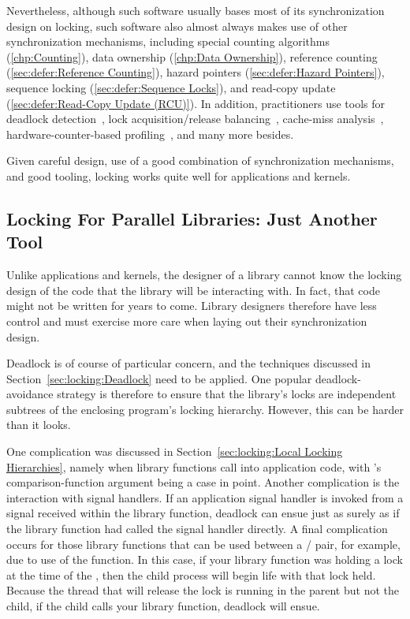 Nevertheless, although such software usually bases most of its
synchronization design on locking, such software also almost always
makes use of other synchronization mechanisms, including
special counting algorithms (\cref{chp:Counting}),
data ownership (\cref{chp:Data Ownership}),
reference counting (\cref{sec:defer:Reference Counting}),
hazard pointers (\cref{sec:defer:Hazard Pointers}),
sequence locking (\cref{sec:defer:Sequence Locks}), and
read-copy update (\cref{sec:defer:Read-Copy Update (RCU)}).
In addition, practitioners use tools for deadlock
detection~\cite{JonathanCorbet2006lockdep},
lock acquisition/release balancing~\cite{JonathanCorbet2004sparse},
cache-miss analysis~\cite{ValgrindHomePage},
hardware-counter-based profiling~\cite{LinuxKernelPerfWiki,OProfileHomePage},
and many more besides.

Given careful design, use of a good combination of synchronization
mechanisms, and good tooling, locking works quite well for applications
and kernels.

\subsection{Locking For Parallel Libraries: Just Another Tool}
\label{sec:locking:Locking For Parallel Libraries: Just Another Tool}

Unlike applications and kernels, the designer of a library cannot
know the locking design of the code that the library will be interacting
with.
In fact, that code might not be written for years to come.
Library designers therefore have less control and must exercise more
care when laying out their synchronization design.

Deadlock is of course of particular concern, and the techniques discussed
in Section~\ref{sec:locking:Deadlock} need to be applied.
One popular deadlock-avoidance strategy is therefore to ensure that
the library's locks are independent subtrees of the enclosing program's
locking hierarchy.
However, this can be harder than it looks.

One complication was discussed in
Section~\ref{sec:locking:Local Locking Hierarchies}, namely
when library functions call into application code, with 's
comparison-function argument being a case in point.
Another complication is the interaction with signal handlers.
If an application signal handler is invoked from a signal received within
the library function, deadlock can ensue just as surely as
if the library function had called the signal handler directly.
A final complication occurs for those library functions that can be used
between a / pair, for example, due to use of
the  function.
In this case, if your library function was holding a lock at the time of
the , then the child process will begin life with that lock held.
Because the thread that will release the lock is running in the parent
but not the child, if the child calls your library function, deadlock
will ensue.

